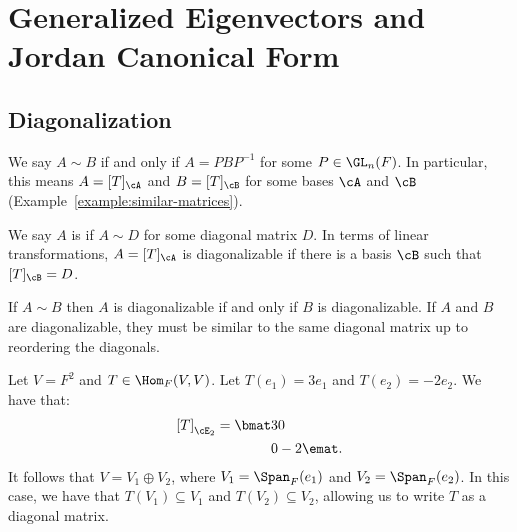 \chapter{Generalized Eigenvectors and Jordan Canonical Form}
\vspace{12pt}

\section{Diagonalization}
    \begin{recall}
        We say $A \sim B$ if and only if $A = PBP^{-1}$ for some $P \in \GL_n(F)$. In particular, this means $A = [T]_\cA$ and $B = [T]_\cB$ for some bases $\cA$ and $\cB$ (Example~\ref{example:similar-matrices}).
    \end{recall}

    \begin{definition}
        We say $A$ is  if $A \sim D$ for some diagonal matrix $D$. In terms of linear transformations, $A = [T]_\cA$ is diagonalizable if there is a basis $\cB$ such that $[T]_\cB = D$.
    \end{definition}

    \begin{example}
        If $A \sim B$ then $A$ is diagonalizable if and only if $B$ is diagonalizable. If $A$ and $B$ are diagonalizable, they must be similar to the same diagonal matrix up to reordering the diagonals. 
    \end{example}

    \begin{example}
        Let $V = F^2$ and $T \in \Hom_F{(V,V)}$. Let $T(e_1) = 3e_1$ and $T(e_2) = -2e_2$. We have that:
            \begin{equation*}
            \begin{split}
                \left[T\right]_{\cE_2} = \bmat 3 & 0 \\ 0 & -2 \emat.
            \end{split}
            \end{equation*}
        It follows that $V = V_1 \oplus V_2$, where $V_1 = \Span_F{(e_1)}$ and $V_2 = \Span_F{(e_2)}$. In this case, we have that $T(V_1) \subseteq V_1$ and $T(V_2) \subseteq V_2$, allowing us to write $T$ as a diagonal matrix.
    \end{example}

